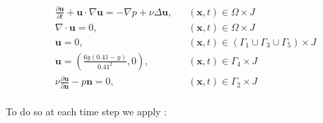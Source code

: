 \begin{equation}\label{eq:turbulent_differential_form_recap}
\begin{aligned}
  &\frac{\partial\mathbf{u}}{\partial t} + \mathbf{u} \cdot \nabla\mathbf{u} = -\nabla p + \nu\Delta\mathbf{u}, &&\left(\mathbf{x}, t\right) \in \Omega \times J \\
  &\nabla \cdot \mathbf{u} = 0, &&\left(\mathbf{x}, t\right) \in \Omega \times J \\
  &\mathbf{u} = 0, &&\left(\mathbf{x}, t\right) \in \left(\Gamma_1 \cup \Gamma_3 \cup \Gamma_5\right) \times J \\
  &\mathbf{u} = \left(\frac{6y(0.41-y)}{0.41^2}, 0\right), &&\left(\mathbf{x}, t\right) \in \Gamma_4 \times J \\
  &\nu\frac{\partial\mathbf{u}}{\partial\mathbf{n}} - p\mathbf{n} = 0, &&\left(\mathbf{x}, t\right) \in \Gamma_2 \times J \\
\end{aligned}
\end{equation}

To do so at each time step we apply :

